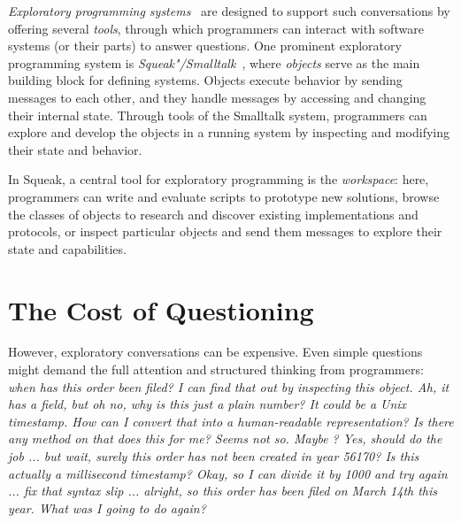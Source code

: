 \emph{Exploratory programming systems}~\cite{sandberg1988smalltalk,rein2018exploratory} are designed to support such conversations by offering several \emph{tools}, through which programmers can interact with software systems (or their parts) to answer questions.
One prominent exploratory programming system is \emph{Squeak"/Smalltalk}~\cite{goldberg1983smalltalk,thiede2023squeak}, where \emph{objects} serve as the main building block for defining systems. %
Objects execute behavior by sending messages to each other, and they handle messages by accessing and changing their internal state.
Through tools of the Smalltalk system, programmers can explore and develop the objects in a running system by inspecting and modifying their state and behavior.

In Squeak, a central tool for exploratory programming is the \emph{workspace}:
here, programmers can write and evaluate scripts to prototype new solutions, browse the classes of objects to research and discover existing implementations and protocols, or inspect particular objects and send them messages to explore their state and capabilities.

\section*{The Cost of Questioning}

However, exploratory conversations can be expensive.
Even simple questions might demand the full attention and structured thinking from programmers:
\emph{%
	when has this order been filed? I can find that out by inspecting this object. Ah, it has a  field, but oh no, why is this just a plain number? It could be a Unix timestamp. How can I convert that into a human-readable representation? Is there any method on  that does this for me? Seems not so. Maybe ? Yes,  should do the job ... but wait, surely this order has not been created in year 56170? Is this actually a millisecond timestamp? Okay, so I can divide it by 1000 and try again ... fix that syntax slip ... alright, so this order has been filed on March 14th this year. What was I going to do again?
}%

